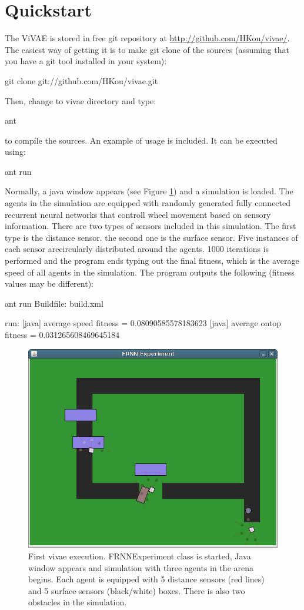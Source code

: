 \section*{Quickstart}

The ViVAE is stored in free git repository at \url{http://github.com/HKou/vivae/}. The easiest way of getting it is to make git clone of the sources (assuming that you have a git tool installed in your system):

\begin{colorverbatim}
git clone git://github.com/HKou/vivae.git 
\end{colorverbatim}

Then, change to vivae directory and type:

\begin{colorverbatim}
ant
\end{colorverbatim}

to compile the sources.
An example of usage is included. It can be executed using:

\begin{colorverbatim}
ant run
\end{colorverbatim}

Normally, a java window appears (see Figure \ref{fig:intro}) and a simulation is loaded. The agents in the simulation are equipped with randomly generated fully connected recurrent neural networks that controll wheel movement based on sensory information. There are two types of sensors included in this simulation. The first type is the distance sensor. the second one is the surface sensor. Five instances of each sensor arecircularly distributed around the agents. 1000 iterations is performed and the program ends typing out the final fitness, which is the average speed of all agents in the simulation. The program outputs the following (fitness values may be different):


\begin{colorverbatim}
ant run
Buildfile: build.xml

run:
     [java] average speed fitness = 0.08090585578183623
     [java] average ontop fitness = 0.031265608469645184
\end{colorverbatim}

\begin{figure}[h!]
\centering
\includegraphics[width=.5\textwidth]{figures/intro}
\caption{First vivae execution. FRNNExperiment class is started, Java window appears and simulation with three agents in the arena begins. Each agent is equipped with 5 distance sensors (red lines) and 5 surface sensors (black/white) boxes. There is also two obstacles in the simulation.}
\label{fig:intro}
\end{figure}

